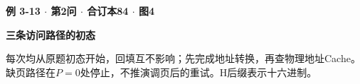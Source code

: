 {\color{ink}\bfseries 例 3-13 \(\cdot \) 第2问 \(\cdot \) 合订本84 \(\cdot \) 图4}\par \textbf{三条访问路径的初态}\par\vspace{2bp}每次均从原题初态开始，回填互不影响；先完成地址转换，再查物理地址Cache。缺页路径在\(P=\allowbreak{}0\)处停止，不推演调页后的重试。H后缀表示十六进制。
